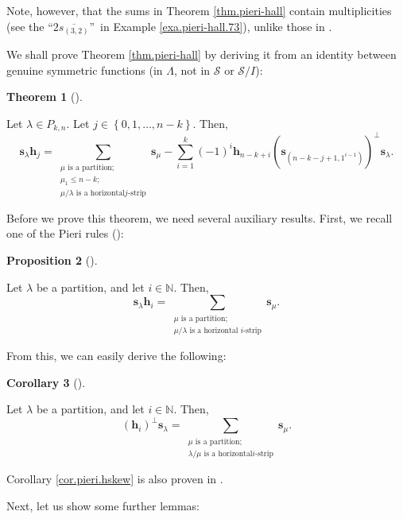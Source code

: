 \documentclass[numbers=enddot,12pt,final,onecolumn,notitlepage]{scrartcl}%
\theoremstyle{definition}
\newtheorem{theo}{Theorem}[section]
\newenvironment{theorem}[1][]
{\begin{theo}[#1]\begin{leftbar}}
{\end{leftbar}\end{theo}}
\newtheorem{prop}[theo]{Proposition}
\newenvironment{proposition}[1][]
{\begin{prop}[#1]\begin{leftbar}}
{\end{leftbar}\end{prop}}
\newtheorem{coro}[theo]{Corollary}
\newenvironment{corollary}[1][]
{\begin{coro}[#1]\begin{leftbar}}
{\end{leftbar}\end{coro}}
\let\sumnonlimits\sum
\renewcommand{\sum}{\sumnonlimits\limits}
\begin{document}
Note, however, that the sums in Theorem \ref{thm.pieri-hall} contain
multiplicities (see the \textquotedblleft$2\overline{s_{\left(  3,2\right)  }%
}$\textquotedblright\ in Example \ref{exa.pieri-hall.73}), unlike those in
\cite[(22)]{BeCiFu99}.

We shall prove Theorem \ref{thm.pieri-hall} by deriving it from an identity
between genuine symmetric functions (in $\Lambda$, not in $\mathcal{S}$ or
$\mathcal{S}/I$):

\begin{theorem}
\label{thm.pieri-hall.Lam}Let $\lambda\in P_{k,n}$. Let $j\in\left\{
0,1,\ldots,n-k\right\}  $. Then,%
\[
\mathbf{s}_{\lambda}\mathbf{h}_{j}=\sum_{\substack{\mu\text{ is a
partition;}\\\mu_{1}\leq n-k;\\\mu/\lambda\text{ is a horizontal
}j\text{-strip}}}\mathbf{s}_{\mu}-\sum_{i=1}^{k}\left(  -1\right)
^{i}\mathbf{h}_{n-k+i}\left(  \mathbf{s}_{\left(  n-k-j+1,1^{i-1}\right)
}\right)  ^{\perp}\mathbf{s}_{\lambda}.
\]

\end{theorem}

Before we prove this theorem, we need several auxiliary results. First, we
recall one of the Pieri rules (\cite[(2.7.1)]{GriRei18}):

\begin{proposition}
\label{prop.pieri.h}Let $\lambda$ be a partition, and let $i\in\mathbb{N}$.
Then,%
\[
\mathbf{s}_{\lambda}\mathbf{h}_{i}=\sum_{\substack{\mu\text{ is a
partition;}\\\mu/\lambda\text{ is a horizontal }i\text{-strip}}}\mathbf{s}%
_{\mu}.
\]

\end{proposition}

From this, we can easily derive the following:

\begin{corollary}
\label{cor.pieri.hskew}Let $\lambda$ be a partition, and let $i\in\mathbb{N}$.
Then,%
\[
\left(  \mathbf{h}_{i}\right)  ^{\perp}\mathbf{s}_{\lambda}=\sum
_{\substack{\mu\text{ is a partition;}\\\lambda/\mu\text{ is a horizontal
}i\text{-strip}}}\mathbf{s}_{\mu}.
\]

\end{corollary}

Corollary \ref{cor.pieri.hskew} is also proven in \cite[(2.8.3)]{GriRei18}.

Next, let us show some further lemmas:
\end{document}
